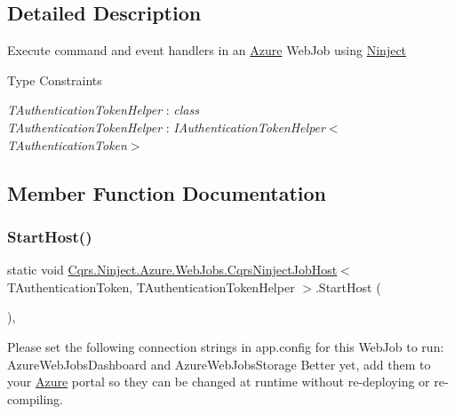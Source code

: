 \subsection{Detailed Description}
Execute command and event handlers in an \hyperlink{namespaceCqrs_1_1Ninject_1_1Azure}{Azure} Web\+Job using \hyperlink{namespaceCqrs_1_1Ninject}{Ninject} 

\begin{Desc}
\item[Type Constraints]\begin{description}
\item[{\em T\+Authentication\+Token\+Helper} : {\em class}]\item[{\em T\+Authentication\+Token\+Helper} : {\em I\+Authentication\+Token\+Helper$<$T\+Authentication\+Token$>$}]\end{description}
\end{Desc}


\subsection{Member Function Documentation}
\mbox{\label{classCqrs_1_1Ninject_1_1Azure_1_1WebJobs_1_1CqrsNinjectJobHost_a9b7fb1deadaf625c21f1d7d55cd5752f_a9b7fb1deadaf625c21f1d7d55cd5752f}} 
\subsubsection{\texorpdfstring{Start\+Host()}{StartHost()}}
{\footnotesize\ttfamily static void \hyperlink{classCqrs_1_1Ninject_1_1Azure_1_1WebJobs_1_1CqrsNinjectJobHost}{Cqrs.\+Ninject.\+Azure.\+Web\+Jobs.\+Cqrs\+Ninject\+Job\+Host}$<$ T\+Authentication\+Token, T\+Authentication\+Token\+Helper $>$.Start\+Host (\begin{DoxyParamCaption}{ }\end{DoxyParamCaption})\hspace{0.3cm}{\ttfamily [static]}, {\ttfamily [protected]}}

Please set the following connection strings in app.\+config for this Web\+Job to run\+: Azure\+Web\+Jobs\+Dashboard and Azure\+Web\+Jobs\+Storage Better yet, add them to your \hyperlink{namespaceCqrs_1_1Ninject_1_1Azure}{Azure} portal so they can be changed at runtime without re-\/deploying or re-\/compiling. 

